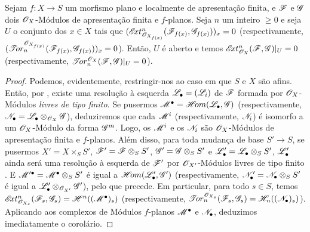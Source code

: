 \begin{corollary}[12.3.4]
\label{IV.12.3.4}
Sejam $f:X\to S$ um morfismo plano e localmente de apresentação
finita, e $\mathscr{F}$ e $\mathscr{G}$ dois $\mathscr{O}_X$-Módulos
de apresentação finita e $f$-planos.
Seja $n$ um inteiro $\geq0$ e seja $U$ o conjunto dos
$x\in X$ tais que
$(\mathscr{E}\!xt^n_{\mathscr{O}_{X_{f(x)}}}(\mathscr{F}_{f(x)},\mathscr{G}_{f(x)}))_x=0$
(respectivamente,
$(\mathscr{T}\!or_n^{\mathscr{O}_{X_{f(x)}}}(\mathscr{F}_{f(x)},\mathscr{G}_{f(x)}))_x=0$).
Então, $U$ é aberto e temos
$\mathscr{E}\!xt^n_{\mathscr{O}_X}(\mathscr{F},\mathscr{G})|_U=0$
(respectivamente, $\mathscr{T}\!or_n^{\mathscr{O}_X}(\mathscr{F},\mathscr{G})|_U=0$).
\end{corollary}

\begin{proof}
Podemos, evidentemente, restringir-nos ao caso em que $S$ e
$X$ são afins. Então, por , existe uma
resolução à esquerda $\mathscr{L}_\bullet=(\mathscr{L}_i)$ de
$\mathscr{F}$ formada por $\mathscr{O}_X$-Módulos \emph{livres de tipo finito}.
Se pusermos $\mathscr{M}^\bullet=\mathscr{H}\!om(\mathscr{L}_\bullet,\mathscr{G})$
(respectivamente, $\mathscr{N}_\bullet=\mathscr{L}_\bullet\otimes_{\mathscr{O}_X}\mathscr{G}$),
deduziremos que cada $\mathscr{M}^i$ (respectivamente, $\mathscr{N}_i$)
é isomorfo a um $\mathscr{O}_X$-Módulo da forma $\mathscr{G}^m$.
Logo, os $\mathscr{M}^i$ e os $\mathscr{N}_i$ são $\mathscr{O}_X$-Módulos
de apresentação finita e $f$-planos.
Além disso, para toda mudança de base $S'\to S$, se pusermos
$X'=X\times_S S'$, $\mathscr{F}'=\mathscr{F}\otimes_S S'$,
$\mathscr{G}'=\mathscr{G}\otimes_S S'$ e
$\mathscr{L}'_\bullet=\mathscr{L}_\bullet\otimes_S S'$,
$\mathscr{L}'_\bullet$ ainda será uma resolução à esquerda de
$\mathscr{F}'$ por $\mathscr{O}_{X'}$-Módulos livres de tipo finito
.
E $\mathscr{M}'^\bullet=\mathscr{M}^\bullet\otimes_S S'$ é igual a
$\mathscr{H}\!om(\mathscr{L}'_\bullet,\mathscr{G}')$
(respectivamente, $\mathscr{N}'_\bullet=\mathscr{N}_\bullet\otimes_S S'$
é igual a $\mathscr{L}'_\bullet\otimes_{\mathscr{O}_{X'}}\mathscr{G}'$),
pelo que precede.
Em particular, para todo $s\in S$, temos
$\mathscr{E}\!xt^n_{\mathscr{O}_{X_s}}(\mathscr{F}_s,\mathscr{G}_s)=\mathscr{H}^n((\mathscr{M}^\bullet)_s)$
(respectivamente,
$\mathscr{T}\!or_n^{\mathscr{O}_{X_s}}(\mathscr{F}_s,\mathscr{G}_s)=\mathscr{H}_n((\mathscr{N}_\bullet)_s)$).
Aplicando  aos complexos de Módulos
$f$-planos $\mathscr{M}^\bullet$ e $\mathscr{N}_\bullet$,
deduzimos imediatamente o corolário.
\end{proof}
